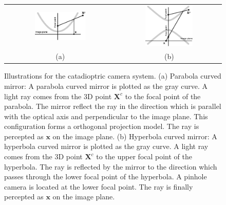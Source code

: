 \documentclass{report}
\begin{document}
\begin{figure}
\centering
\begin{tabular}{cc}
\includegraphics[width=0.48\textwidth]{images/parabola.eps}&
\includegraphics[width=0.48\textwidth]{images/hyperbola.eps}\\
(a) & (b)
\end{tabular}
\caption{Illustrations for the catadioptric camera system. (a) Parabola curved mirror: A parabola curved mirror is plotted as the gray curve. A light ray comes from the 3D point $\mathbf{X}^c$ to the focal point of the parabola. The mirror reflect the ray in the direction which is parallel with the optical axis and perpendicular to the image plane. This configuration forms a orthogonal projection model. The ray is percepted as $\mathbf{x}$ on the image plane. (b) Hyperbola curved mirror: A hyperbola curved mirror is plotted as the gray curve. A light ray comes from the 3D point $\mathbf{X}^c$ to the upper focal point of the hyperbola. The ray is reflected by the mirror to the direction which passes through the lower focal point of the hyperbola. A pinhole camera is located at the lower focal point. The ray is finally percepted as $\mathbf{x}$ on the image plane. }
\label{cataProjFig}
\end{figure}
\end{document}
